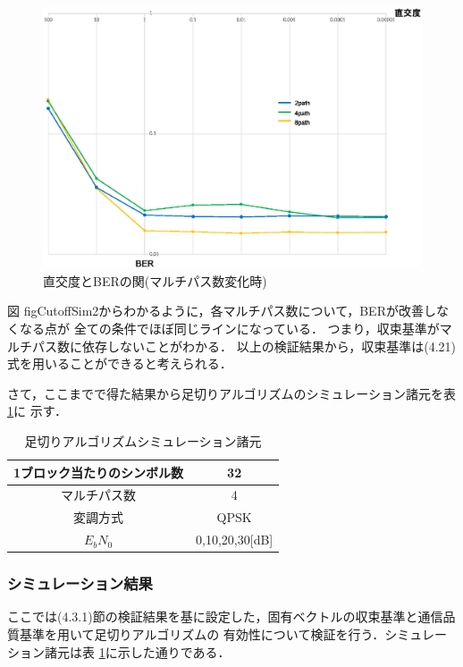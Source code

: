 \begin{figure}[ht]
    \centering
    \includegraphics[width=0.95\linewidth]{chapter4/figure/CutoffSim2.eps}
    \caption{直交度とBERの関(マルチパス数変化時)}
    \label{figCutoffSim2}
\end{figure}

図 {figCutoffSim2}からわかるように，各マルチパス数について，BERが改善しなくなる点が
全ての条件でほぼ同じラインになっている．
つまり，収束基準がマルチパス数に依存しないことがわかる．
以上の検証結果から，収束基準は(4.21)式を用いることができると考えられる．

さて，ここまでで得た結果から足切りアルゴリズムのシミュレーション諸元を表 \ref{tabCutoff3}に
示す．

\begin{table}[ht]
    \begin{tabular}{|c|c|} \hline
        1ブロック当たりのシンボル数 & 32 \\ \hline
        マルチパス数 & 4 \\ \hline
        変調方式 & QPSK \\ \hline
        $E_bN_0$ & 0,10,20,30[dB] \\ \hline
    \end{tabular}
    \centering
    \caption{足切りアルゴリズムシミュレーション諸元}
    \label{tabCutoff3}
\end{table}

\subsubsection{シミュレーション結果}
ここでは(4.3.1)節の検証結果を基に設定した，固有ベクトルの収束基準と通信品質基準を用いて足切りアルゴリズムの
有効性について検証を行う．シミュレーション諸元は表 \ref{tabCutoff3}に示した通りである．

